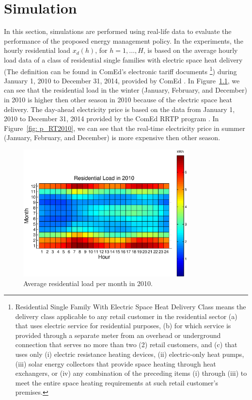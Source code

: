 \chapter{Simulation}\label{cha: Simulation}

In this section, simulations are performed using real-life data to evaluate the performance of the proposed energy management policy. In the experiments, the hourly residential load $x_d(h)$, for $h=1,\ldots, H$, is based on the average hourly load data of a class of residential single families with electric space heat delivery (The definition can be found in ComEd's electronic tariff documents \footnote{Residential Single Family With Electric Space Heat Delivery Class means the delivery class applicable to any retail customer in the residential sector (a) that uses electric service for residential purposes, (b) for which service is provided through a separate meter from an overhead or underground connection that serves no more than two (2) retail customers, and (c) that uses only (i) electric resistance heating devices, (ii) electric-only heat pumps, (iii) solar energy collectors that provide space heating through heat exchangers, or (iv) any combination of the preceding items (i) through (iii) to meet the entire space heating requirements at such retail customer's premises.}) during January 1, 2010 to December 31, 2014, provided by ComEd \cite{comed:}. In Figure~\ref{fig: x2010}, we can see that the residential load in the winter (January, February, and December) in 2010 is higher then other season in 2010 because of the electric space heat delivery. The day-ahead electricity price is based on the data from January 1, 2010 to December 31, 2014 provided by the ComEd RRTP program \cite{comed:}. In Figure~\ref{fig: p_RT2010}, we can see that the real-time electricity price in summer (January, February, and December) is more expensive then other season.

\begin{figure}[H]
    \centering
    \includegraphics[width = 0.8\textwidth]{fig/x2010.eps}
    \caption{Average residential load per month in 2010.}
    \label{fig: x2010}
\end{figure}

